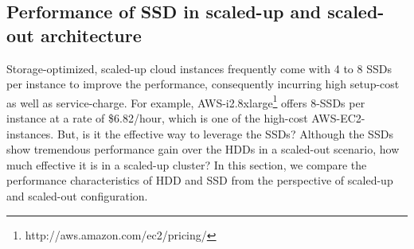 \documentclass[conference]{IEEEtran}
\begin{document}
\subsection {Performance of SSD in scaled-up and scaled-out architecture} \label{ScaledupClusterAndSSD}
Storage-optimized, scaled-up cloud instances frequently come with 4 to 8 SSDs per instance to improve the performance, consequently incurring high setup-cost as well as service-charge.
For example, AWS-i2.8xlarge\footnote{http://aws.amazon.com/ec2/pricing/} offers 8-SSDs per instance at a rate of \$6.82/hour, which is one of the high-cost AWS-EC2-instances.
But, is it the effective way to leverage the SSDs?
Although the SSDs show tremendous performance gain over the HDDs in a scaled-out scenario, how much effective it is in a scaled-up cluster?
In this section, we compare the performance characteristics of HDD and SSD from the perspective of scaled-up and scaled-out configuration.
\end{document}
